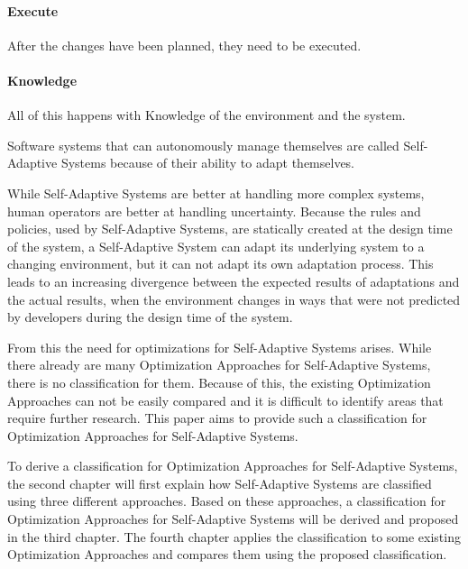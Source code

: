 \paragraph*{Execute} After the changes have been planned, they need to be executed.
\paragraph*{Knowledge} All of this happens with Knowledge of the environment and the system.
\newline
\par


Software systems that can autonomously manage themselves are called Self-Adaptive Systems
because of their ability to adapt themselves.
\newline
\par



While Self-Adaptive Systems are better at handling more complex systems,
human operators are better at handling uncertainty.
Because the rules and policies, used by Self-Adaptive Systems,
are statically created at the design time of the system, a Self-Adaptive System can adapt its underlying system to a changing environment,
but it can not adapt its own adaptation process.
This leads to an increasing divergence between the expected results of adaptations and the actual results,
when the environment changes in ways that were not predicted by developers during the design time of the system.
\newline
\par


From this the need for optimizations for Self-Adaptive Systems arises.
While there already are many Optimization Approaches for Self-Adaptive Systems,
there is no classification for them.
Because of this, the existing Optimization Approaches can not be easily compared
and it is difficult to identify areas that require further research.
This paper aims to provide such a classification for Optimization Approaches for Self-Adaptive Systems.
\newline
\par


To derive a classification for Optimization Approaches for Self-Adaptive Systems,
the second chapter will first explain how Self-Adaptive Systems are classified
using three different approaches.
Based on these approaches, a classification for Optimization Approaches for Self-Adaptive Systems will be derived
and proposed in the third chapter.
The fourth chapter applies the classification to some existing Optimization Approaches
and compares them using the proposed classification.
